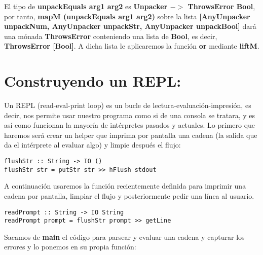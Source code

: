 El tipo de \textbf{unpackEquals arg1 arg2} es \textbf{Unpacker $-\!>$ ThrowsError Bool}, por tanto, \textbf{mapM (unpackEquals arg1 arg2)} sobre la lista \textbf{[AnyUnpacker unpackNum, AnyUnpacker unpackStr, AnyUnpacker unpackBool]} dar\'a una m\'onada \textbf{ThrowsError} conteniendo una lista de \textbf{Bool}, es decir, \textbf{ThrowsError [Bool]}. A dicha lista le aplicaremos la funci\'on \textbf{or} mediante \textbf{liftM}.\\

\section{Construyendo un REPL:}
\label{3:sec5}

Un REPL (read-eval-print loop) es un bucle de lectura-evaluaci\'on-impresi\'on, es decir, nos permite usar nuestro programa como si de una consola se tratara, y es as\'i como funcionan la mayor\'ia de int\'erpretes pasados y actuales. Lo primero que haremos ser\'a crear un helper que imprima por pantalla una cadena (la salida que da el int\'erprete al evaluar algo) y limpie despu\'es el flujo:\\

\begin{minipage}{\linewidth}
\begin{footnotesize}
\begin{lstlisting}[frame=single]
flushStr :: String -> IO ()
flushStr str = putStr str >> hFlush stdout
\end{lstlisting}
\end{footnotesize}
\end{minipage}

A continuaci\'on usaremos la funci\'on recientemente definida para imprimir una cadena por pantalla, limpiar el flujo y posteriormente pedir una l\'inea al usuario.\\

\begin{minipage}{\linewidth}
\begin{footnotesize}
\begin{lstlisting}[frame=single]
readPrompt :: String -> IO String
readPrompt prompt = flushStr prompt >> getLine
\end{lstlisting}
\end{footnotesize}
\end{minipage}

Sacamos de \textbf{main} el c\'odigo para parsear y evaluar una cadena y capturar los errores y lo ponemos en su propia funci\'on:\\

